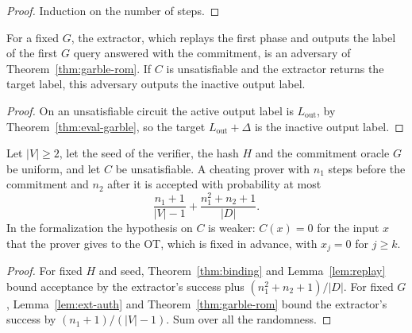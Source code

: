 \begin{proof}
  \leanok
  Induction on the number of steps.
\end{proof}

\begin{lemma}
  \label{lem:ext-auth}
  \leanok
  For a fixed $G$, the extractor, which replays the first phase and outputs the label of the first
  $G$ query answered with the commitment, is an adversary of Theorem~\ref{thm:garble-rom}. If $C$
  is unsatisfiable and the extractor returns the target label, this adversary outputs the inactive
  output label.
\end{lemma}

\begin{proof}
  \leanok
  On an unsatisfiable circuit the active output label is $L_{\mathrm{out}}$, by
  Theorem~\ref{thm:eval-garble}, so the target $L_{\mathrm{out}} + \Delta$ is the inactive output
  label.
\end{proof}

\begin{theorem}
  \label{thm:e2e}
  \leanok
  Let $|V| \geq 2$, let the seed of the verifier, the hash $H$ and the commitment oracle $G$ be
  uniform, and let $C$ be unsatisfiable. A cheating prover with $n_1$ steps before the commitment and $n_2$ after it is
  accepted with probability at most
  \[ \frac{n_1 + 1}{|V| - 1} + \frac{n_1^2 + n_2 + 1}{|D|} . \]
  In the formalization the hypothesis on $C$ is weaker: $C(x) = 0$ for the input $x$ that the
  prover gives to the OT, which is fixed in advance, with $x_j = 0$ for $j \geq k$.
\end{theorem}

\begin{proof}
  \leanok
  For fixed $H$ and seed, Theorem~\ref{thm:binding} and Lemma~\ref{lem:replay} bound acceptance by
  the extractor's success plus $(n_1^2 + n_2 + 1)/|D|$. For fixed $G$, Lemma~\ref{lem:ext-auth} and
  Theorem~\ref{thm:garble-rom} bound the extractor's success by $(n_1 + 1)/(|V| - 1)$. Sum over all
  the randomness.
\end{proof}

